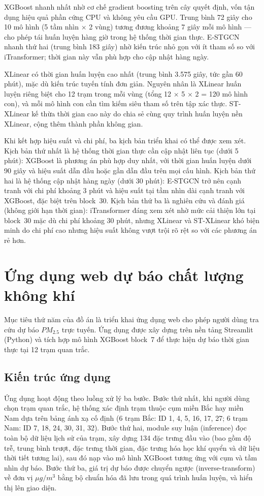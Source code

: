 XGBoost nhanh nhất nhờ cơ chế gradient boosting trên cây quyết định, vốn tận dụng hiệu quả phần cứng CPU và không yêu cầu GPU. Trung bình 72 giây cho 10 mô hình (5 tầm nhìn $\times$ 2 vùng) tương đương khoảng 7 giây mỗi mô hình --- cho phép tái huấn luyện hàng giờ trong hệ thống thời gian thực. E-STGCN nhanh thứ hai (trung bình 183 giây) nhờ kiến trúc nhỏ gọn với ít tham số so với iTransformer; thời gian này vẫn phù hợp cho cập nhật hàng ngày.

XLinear có thời gian huấn luyện cao nhất (trung bình 3.575 giây, tức gần 60 phút), mặc dù kiến trúc tuyến tính đơn giản. Nguyên nhân là XLinear huấn luyện riêng biệt cho 12 trạm trong mỗi vùng (tổng 12 $\times$ 5 $\times$ 2 = 120 mô hình con), và mỗi mô hình con cần tìm kiếm siêu tham số trên tập xác thực. ST-XLinear kế thừa thời gian cao này do chia sẻ cùng quy trình huấn luyện nền XLinear, cộng thêm thành phần không gian.

Khi kết hợp hiệu suất và chi phí, ba kịch bản triển khai có thể được xem xét. Kịch bản thứ nhất là hệ thống thời gian thực cần cập nhật liên tục (dưới 5 phút): XGBoost là phương án phù hợp duy nhất, với thời gian huấn luyện dưới 90 giây và hiệu suất dẫn đầu hoặc gần dẫn đầu trên mọi cấu hình. Kịch bản thứ hai là hệ thống cập nhật hàng ngày (dưới 30 phút): E-STGCN trở nên cạnh tranh với chi phí khoảng 3 phút và hiệu suất tại tầm nhìn dài cạnh tranh với XGBoost, đặc biệt trên block~30. Kịch bản thứ ba là nghiên cứu và đánh giá (không giới hạn thời gian): iTransformer đáng xem xét nhờ mức cải thiện lớn tại block~30 mặc dù chi phí khoảng 30 phút, nhưng XLinear và ST-XLinear khó biện minh do chi phí cao nhưng hiệu suất không vượt trội rõ rệt so với các phương án rẻ hơn.

\section{Ứng dụng web dự báo chất lượng không khí}

Mục tiêu thứ năm của đồ án là triển khai ứng dụng web cho phép người dùng tra cứu dự báo $PM_{2.5}$ trực tuyến. Ứng dụng được xây dựng trên nền tảng Streamlit (Python) và tích hợp mô hình XGBoost block~7 để thực hiện dự báo thời gian thực tại 12 trạm quan trắc.

\subsection{Kiến trúc ứng dụng}

Ứng dụng hoạt động theo luồng xử lý ba bước. Bước thứ nhất, khi người dùng chọn trạm quan trắc, hệ thống xác định trạm thuộc cụm miền Bắc hay miền Nam dựa trên bảng ánh xạ cố định (6 trạm Bắc: ID 1, 4, 5, 16, 17, 27; 6 trạm Nam: ID 7, 18, 24, 30, 31, 32). Bước thứ hai, module suy luận (inference) đọc toàn bộ dữ liệu lịch sử của trạm, xây dựng 134 đặc trưng đầu vào (bao gồm độ trễ, trung bình trượt, đặc trưng thời gian, đặc trưng hóa học khí quyển và dữ liệu thời tiết tương lai), sau đó nạp vào mô hình XGBoost tương ứng với cụm và tầm nhìn dự báo. Bước thứ ba, giá trị dự báo được chuyển ngược (inverse-transform) về đơn vị $\mu g/m^3$ bằng bộ chuẩn hóa đã lưu trong quá trình huấn luyện, và hiển thị lên giao diện.

